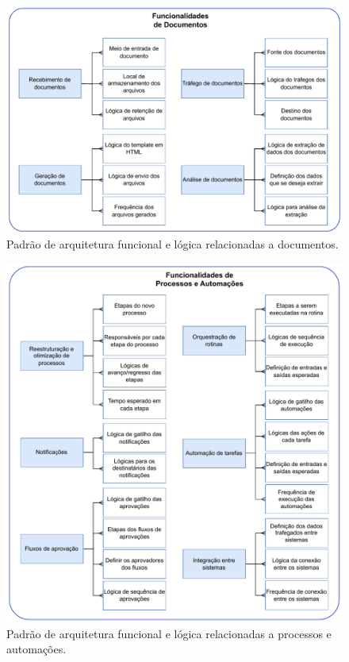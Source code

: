 	\begin{figure}[!htb]
		\centering
		\includegraphics[width=1\textwidth]{./figuras/documetFunctionalities.pdf}
		\caption{Padrão de arquitetura funcional e lógica relacionadas a documentos.}
		\label{fig:metodologia:documetFunctionalities}
	\end{figure}

	\begin{figure}[!htb]
		\centering
		\includegraphics[width=1\textwidth]{./figuras/processFunctionalities.pdf}
		\caption{Padrão de arquitetura funcional e lógica relacionadas a processos e automações.}
		\label{fig:metodologia:processFunctionalities}
	\end{figure}

